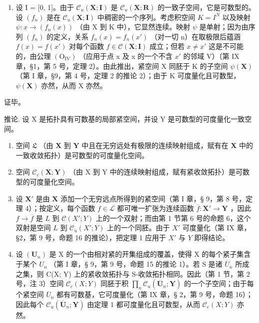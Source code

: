 \begin{enumerate}
\item
  设 I = {[}0, 1{]}。由于 \(\mathcal{C}_{u}(\mathbf{X};\mathbf{I})\) 是 \(\mathcal{C}_{u}(\mathbf{X};\mathbf{R})\) 的一致子空间，它是可数型的。设 \((f_{n})\) 是在 \(\mathcal{C}_{u}(\mathbf{X};\mathbf{I})\) 中稠密的一个序列。考虑积空间 \(K=I^{N}\) 以及映射 \(\psi: x\to(f_{n}(x))\) （由 X 到 K 中），它显然连续。映射 \(\psi\) 是单射；因为由序列 \((f_{n})\) 的定义，关系 \(f_{n}(x)=f_{n}(x')\) （对一切 n）在取极限后蕴涵 \(f(x)=f(x')\) 对每个函数 \(f\in\mathcal{C}(\mathbf{X};\mathbf{I})\) 成立；但若 \(x\neq x'\) 这是不可能的，由公理 \((\mathrm{O}_{\mathrm{IV}})\) （应用于点 x 及 x 的一个不含 \(x'\) 的邻域 V）（第 IX 章，§1，第 5 号，定理 2）。由此推出，紧空间 X 同胚于 K 的子空间 \(\psi(\mathbf{X})\) （第 I 章，§9，第 4 号，定理 2 的推论 2）；由于 K 可度量化且可数型，\(\psi(\mathbf{X})\) 亦然，从而 X 亦然。
\end{enumerate}

证毕。

推论. 设 X 是拓扑具有可数基的局部紧空间，并设 Y 是可数型的可度量化一致空间。

\begin{enumerate}
\def\labelenumi{\alph{enumi})}
\item
  空间 \(\mathfrak{L}\) （由 \(\mathbf{X}\) 到 \(\mathbf{Y}\) 中且在无穷远处有极限的连续映射组成，赋有在 \(\mathbf{X}\) 中的一致收敛拓扑）是可数型的可度量化空间。
\item
  空间 \(\mathcal{C}_{c}(\mathbf{X};\mathbf{Y})\) （由 X 到 Y 中的连续映射组成，赋有紧收敛拓扑）是可数型的可度量化空间。
\item
  设 \(\mathbf{X}'\) 是由 \(\mathbf{X}\) 添加一个无穷远点所得到的紧空间（第 I 章，§ 9，第 8 号，定理 4）；按定义，每个函数 \(f \in \mathcal{L}\) 都可唯一扩张为连续函数 \(\overline{f} \colon \mathbf{X}' \to \mathbf{Y}\) ，因此 \(f \to \overline{f}\) 是 \(L\) 到 \(\mathcal{C}(X'; Y)\) 上的一个双射；而由第 1 节第 6 号的命题 6，这个双射是空间 \(L\) 到 \(\mathcal{C}_u(X'; Y)\) 上的一个同胚。由于 \(X'\) 可度量化（第 IX 章，§2，第 9 号，命题 16 的推论），把定理 1 应用于 \(X'\) 与 \(Y\) 即得结论。
\item
  设 \((\mathbf{U}_{n})\) 是 X 的一个由相对紧的开集组成的覆盖，使得 X 的每个紧子集含于某个 \(U_{n}\) （第 I 章，§ 9，第 9 号，命题 15 的推论 1）。若 S 是诸 \(\overline{U}_{n}\) 所成之集，则 C(X; Y) 上的紧收敛拓扑与 S-收敛拓扑相同。因此（第 1 节，第 2 号，注 3）空间 \(\mathcal{C}_{c}(X; Y)\) 同胚于积 \(\prod_{n}\mathcal{C}_{u}(\overline{\mathbf{U}}_{n};\mathbf{Y})\) 的一个子空间；由于每个紧空间 \(\overline{U}_{n}\) 都有可数基，它可度量化（第 IX 章，§ 2，第 9 号，命题 16）；因此每个 \(\mathcal{C}_{u}(\overline{\mathbf{U}}_{n};\mathbf{Y})\) 由定理 1 都可度量化且可数型，从而 \(\mathcal{C}_{c}(X;Y)\) 亦然。
\end{enumerate}

